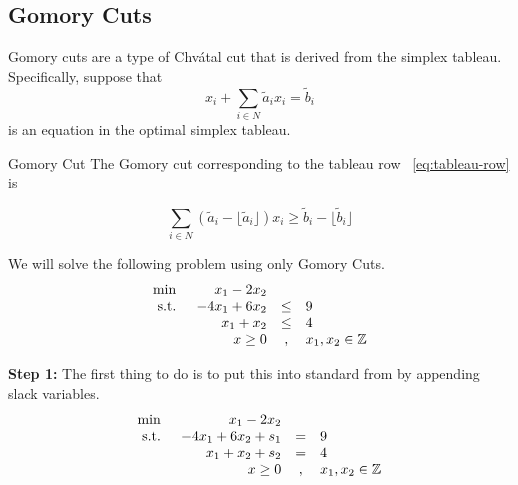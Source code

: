 \documentclass[../open-optimization/open-optimization.tex]{subfiles}
\begin{document}
\subsection{Gomory Cuts}
Gomory cuts are a type of Chv\'atal cut that is derived from the simplex tableau.  Specifically, suppose that 
\begin{equation}
\label{eq:tableau-row}
 x_i + \sum_{i\in N} \tilde a_i x_i = \tilde b_i
\end{equation}
is an equation in the optimal simplex tableau. 

\begin{general}{Gomory Cut}{}
The Gomory cut corresponding to the tableau row ~\eqref{eq:tableau-row} is

\begin{equation}
\label{eq:gomory-cut}
\sum_{i\in N} (\tilde a_i - \lfloor \tilde a_i \rfloor) x_i \geq \tilde b_i - \lfloor \tilde b_i\rfloor
\end{equation}


\end{general}


We will solve the following problem using only Gomory Cuts.
\begin{equation*}
\begin{array}{lrcl}
\min & x_1 - 2x_2\\
\text{ s.t. } & -4x_1 + 6x_2  & \leq & 9\\
& x_1 + x_2   & \leq & 4\\
& x \geq 0 & , & x_1,x_2 \in {\mathbb{Z}}
\end{array}
\end{equation*}

\textbf{Step 1:} The first thing to do is to put this into standard from by appending slack variables.
\begin{equation}
\label{eq:gomory-standard-form}
\begin{array}{lrcl}
\min & x_1 - 2x_2\\
\text{ s.t. } & -4x_1 + 6x_2 + s_1 & = & 9\\
& x_1 + x_2 + s_2  & = & 4\\
& x \geq 0 & , & x_1,x_2 \in {\mathbb{Z}}
\end{array}
\end{equation}
\end{document}
